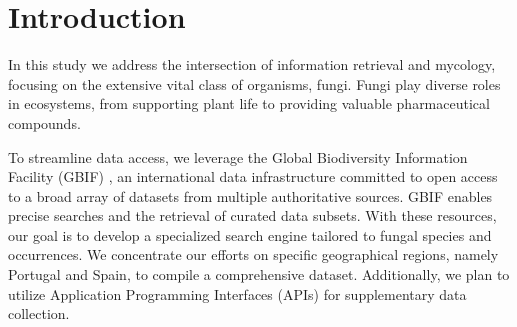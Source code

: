\section{Introduction}

In this study we address the intersection of information retrieval and mycology, focusing on the extensive vital class of organisms, fungi. Fungi play diverse roles in ecosystems, from supporting plant life to providing valuable pharmaceutical compounds.

To streamline data access, we leverage the Global Biodiversity Information Facility (GBIF) \cite{GBIF}, an international data infrastructure committed to open access to a broad array of datasets \cite{Dataset} from multiple authoritative sources. GBIF enables precise searches and the retrieval of curated data subsets. With these resources, our goal is to develop a specialized search engine tailored to fungal species and occurrences. We concentrate our efforts on specific geographical regions, namely Portugal and Spain, to compile a comprehensive dataset. Additionally, we plan to utilize Application Programming Interfaces (APIs) for supplementary data collection. 